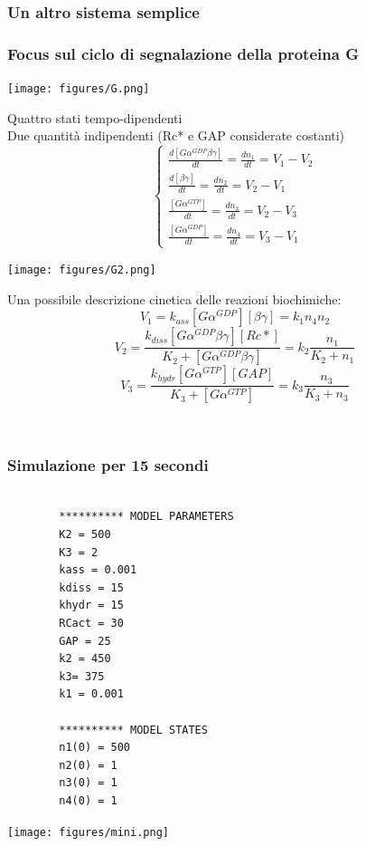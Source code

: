 \documentclass{article}
\begin{document}
\subsubsection{Un altro sistema semplice}
\subsubsection*{Focus sul ciclo di segnalazione della proteina G}
\begin{minipage}[c]{.5\textwidth}
    \centering
    \texttt{[image: figures/G.png]}
\end{minipage}%
\begin{minipage}[c]{.5\textwidth}
    \centering
    \large
    Quattro stati tempo-dipendenti\\
    Due quantità indipendenti (Rc* e GAP considerate costanti)
    $$\begin{cases}
        \frac{d[G\alpha^{GDP}\beta \gamma]}{dt} = \frac{dn_1}{dt} = V_1 - V_2\\
        \frac{d[\beta \gamma]}{dt} = \frac{dn_2}{dt} = V_2 -V_1\\
        \frac{[G\alpha^{GTP}]}{dt} = \frac{dn_3}{dt} = V_2 -V_3\\
        \frac{[G\alpha^{GDP}]}{dt} = \frac{dn_4}{dt} = V_3 -V_1
    \end{cases}$$
\end{minipage}

\begin{minipage}[c]{.5\textwidth}
    \centering
    \texttt{[image: figures/G2.png]}
\end{minipage}%
\begin{minipage}[c]{.5\textwidth}
    \centering
    \large
    Una possibile descrizione cinetica delle reazioni biochimiche:
    $$V_1 = k_{ass}[G\alpha^{GDP}][\beta \gamma] = k_1n_4n_2$$
    $$V_2 = \frac{k_{diss}[G\alpha^{GDP}\beta \gamma][Rc*]}{K_2 + [G\alpha^{GDP}\beta \gamma]} = k_2\frac{n_1}{K_2 + n_1}$$
    $$V_3 = \frac{k_{hydr}[G\alpha^{GTP}][GAP]}{K_3 + [G\alpha^{GTP}]} = k_3\frac{n_3}{K_3 + n_3}$$
\end{minipage}\\
\subsubsection*{Simulazione per 15 secondi}
\begin{minipage}[c]{.5\textwidth}
    \centering
    \begin{verbatim}

        ********** MODEL PARAMETERS
        K2 = 500
        K3 = 2
        kass = 0.001
        kdiss = 15
        khydr = 15
        RCact = 30
        GAP = 25
        k2 = 450
        k3= 375
        k1 = 0.001
    
        ********** MODEL STATES
        n1(0) = 500
        n2(0) = 1
        n3(0) = 1
        n4(0) = 1

    \end{verbatim}
\end{minipage}%
\begin{minipage}[c]{.5\textwidth}
    \centering
    \texttt{[image: figures/mini.png]}
\end{minipage}
\end{document}
